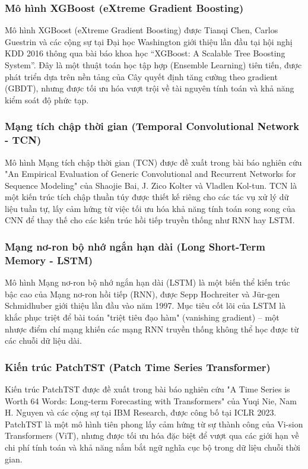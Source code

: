 \documentclass[10pt,twoside]{article}
\begin{document}
\subsubsection{Mô hình XGBoost (eXtreme Gradient Boosting)}
Mô hình XGBoost (eXtreme Gradient Boosting) \cite{chen_xgboost_2016} được Tianqi Chen, Carlos Guestrin và các cộng sự tại Đại học Washington giới thiệu lần đầu tại hội nghị KDD 2016 thông qua bài báo khoa học “XGBoost: A Scalable Tree Boosting System”. Đây là một thuật toán học tập hợp (Ensemble Learning) tiên tiến, được phát triển dựa trên nền tảng của Cây quyết định tăng cường theo gradient (GBDT), nhưng được tối ưu hóa vượt trội về tài nguyên tính toán và khả năng kiểm soát độ phức tạp.
\subsubsection{Mạng tích chập thời gian (Temporal Convolutional Network - TCN)}
Mô hình Mạng tích chập thời gian (TCN) \cite{bai_empirical_2018} được đề xuất trong bài báo nghiên cứu "An Empirical Evaluation of Generic Convolutional and Recurrent Networks for Sequence Modeling" của Shaojie Bai, J. Zico Kolter và Vladlen Kol-tun. TCN là một kiến trúc tích chập thuần túy được thiết kế riêng cho các tác vụ xử lý dữ liệu tuần tự, lấy cảm hứng từ việc tối ưu hóa khả năng tính toán song song của CNN để thay thế cho các kiến trúc hồi tiếp truyền thống như RNN hay LSTM.
\subsubsection{Mạng nơ-ron bộ nhớ ngắn hạn dài (Long Short-Term Memory - LSTM)}
Mô hình Mạng nơ-ron bộ nhớ ngắn hạn dài (LSTM) \cite{hochreiter_long_1997} là một biến thể kiến trúc bậc cao của Mạng nơ-ron hồi tiếp (RNN), được Sepp Hochreiter và Jür-gen Schmidhuber giới thiệu lần đầu vào năm 1997. Mục tiêu cốt lõi của LSTM là khắc phục triệt để bài toán "triệt tiêu đạo hàm" (vanishing gradient) – một nhược điểm chí mạng khiến các mạng RNN truyền thống không thể học được từ các chuỗi dữ liệu dài.
\subsubsection{Kiến trúc PatchTST (Patch Time Series Transformer)}
Kiến trúc PatchTST \cite{nie_time_2023} được đề xuất trong bài báo nghiên cứu "A Time Series is Worth 64 Words: Long-term Forecasting with Transformers" của Yuqi Nie, Nam H. Nguyen và các cộng sự tại IBM Research, được công bố tại ICLR 2023. PatchTST là một mô hình tiên phong lấy cảm hứng từ sự thành công của Vi-sion Transformers (ViT), nhưng được tối ưu hóa đặc biệt để vượt qua các giới hạn về chi phí tính toán và khả năng nắm bắt ngữ nghĩa cục bộ trong dữ liệu chuỗi thời gian.
\end{document}
